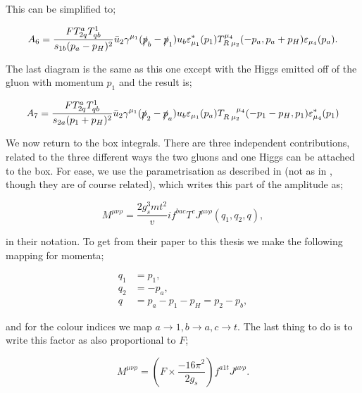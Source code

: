 This can be simplified to;

\begin{equation}
A_6 = \frac{F T^a_{2q}T^1_{qb}}{s_{1b}(p_a-p_H)^2} \bar{u}_2 \gamma^{\mu_1} (\slashed{p}_b - \slashed{p}_1)u_b \varepsilon_{\mu_1}^*(p_1)T_{R \hspace{2pt} \mu_2}^{\mu_4}(-p_a,p_a+p_H)\varepsilon_{\mu_4}(p_a).
\end{equation}

The last diagram is the same as this one except with the Higgs emitted off of the gluon with momentum $p_1$ and the result is;

\begin{equation}
A_7 = \frac{F T^a_{2q}T^1_{qb}}{s_{2a}(p_1+p_H)^2} \bar{u}_2 \gamma^{\mu_1} (\slashed{p}_2 - \slashed{p}_a)u_b \varepsilon_{\mu_1}(p_a)T_{R \hspace{2pt} \mu_2}^{\hspace{12pt} \mu_4}(-p_1-p_H,p_1)\varepsilon^*_{\mu_4}(p_1)
\end{equation}

We now return to the box integrals. There are three independent contributions, related to the three different ways the two gluons and one Higgs can be attached to the box. For ease, we use the parametrisation as described in \cite{Duca2003} (not as in \cite{DelDuca2001}, though they are of course related), which writes this part of the amplitude as;

\begin{equation}
M^{\mu \nu \rho} = \frac{2 g_s^3 mt^2}{v} i f^{bac}T^c J^{\mu \nu \rho}(q_1,q_2,q),
\end{equation}

in their notation. To get from their paper to this thesis we make the following mapping for momenta;

\begin{subequations}
\begin{align}
q_1 &= p_1, \\
q_2 &= - p_a, \\
q &= p_a-p_1-p_H = p_2-p_b,
\end{align}
\end{subequations}

and for the colour indices we map $a \to 1, b \to a, c\to t$. The last thing to do is to write this factor as also proportional to $F$;

\begin{equation}
M^{\mu \nu \rho} = \left(F \times \frac{-16 \pi^2}{2 g_s} \right) f^{a1t}J^{\mu \nu \rho}.
\end{equation}

